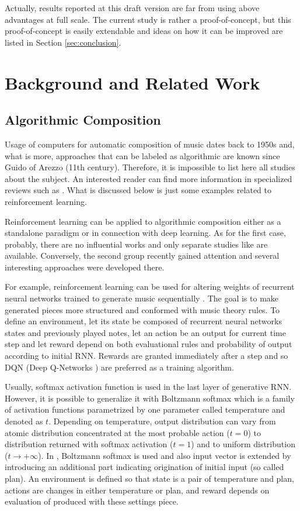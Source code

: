 \documentclass{article}
\begin{document}
Actually, results reported at this draft version are far from using above advantages at full scale. The current study is rather a proof-of-concept, but this proof-of-concept is easily extendable and ideas on how it can be improved are listed in Section \ref{sec:conclusion}.


\section{Background and Related Work}
\label{sec:literature}

\subsection{Algorithmic Composition}
\label{subsec:composition}

Usage of computers for automatic composition of music dates back to 1950s and, what is more, approaches that can be labeled as algorithmic are known since Guido of Arezzo (11th century). Therefore, it is impossible to list here all studies about the subject. An interested reader can find more information in specialized reviews such as \cite{fernandez2013ai}. What is discussed below is just some examples related to reinforcement learning.

Reinforcement learning can be applied to algorithmic composition either as a standalone paradigm or in connection with deep learning. As for the first case, probably, there are no influential works and only separate studies like \cite{yi2007automatic} are available. Conversely, the second group recently gained attention and several interesting approaches were developed there.

For example, reinforcement learning can be used for altering weights of recurrent neural networks trained to generate music sequentially \cite{jaques2016generating, kotecha2018bach}. The goal is to make generated pieces more structured and conformed with music theory rules. To define an environment, let its state be composed of recurrent neural networks states and previously played notes, let an action be an output for current time step and let reward depend on both evaluational rules and probability of output according to initial RNN. Rewards are granted immediately after a step and so DQN (Deep Q-Networks \cite{mnih2013playing}) are preferred as a training algorithm.

Usually, softmax activation function is used in the last layer of generative RNN. However, it is possible to generalize it with Boltzmann softmax which is a family of activation functions parametrized by one parameter called temperature and denoted as $t$. Depending on temperature, output distribution can vary from atomic distribution concentrated at the most probable action ($t = 0$) to distribution returned with softmax activation ($t = 1$) and to uniform distribution ($t \to +\infty$). In \cite{kumar2019polyphonic}, Boltzmann softmax is used and also input vector is extended by introducing an additional part indicating origination of initial input (so called plan). An environment is defined so that state is a pair of temperature and plan, actions are changes in either temperature or plan, and reward depends on evaluation of produced with these settings piece.
\end{document}
